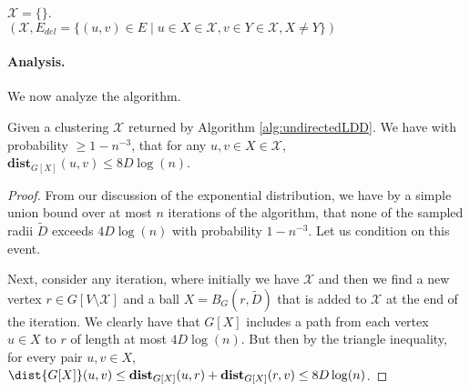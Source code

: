 \begin{algorithm}
$\mathcal{X} = \{\}$.\\
\Return $(\mathcal{X}, E_{del} = \{ (u,v) \in E \;|\; u \in X \in \mathcal{X}, v \in Y \in \mathcal{X}, X \neq Y\})$
\caption{$\textsc{ComputeLDD}(G, D)$}
\label{alg:undirectedLDD}
\end{algorithm}

\paragraph{Analysis.} We now analyze the algorithm.

\begin{claim}
Given a clustering $\mathcal{X}$ returned by Algorithm \ref{alg:undirectedLDD}. We have with probability $\geq 1 - n^{-3}$, that for any $u,v \in X \in \mathcal{X}$, $\mathbf{dist}_{G[X]}(u,v) \leq 8 D \log(n)$. 
\end{claim}
\begin{proof}
From our discussion of the exponential distribution, we have by a simple union bound over at most $n$ iterations of the algorithm, that none of the sampled radii $\tilde{D}$ exceeds $4 D \log(n)$ with probability $1 - n^{-3}$. Let us condition on this event. 

Next, consider any iteration, where initially we have $\mathcal{X}$ and then we find a new vertex $r \in G[V \setminus \mathcal{X}]$ and a ball $X = B_G(r, \tilde{D})$ that is added to $\mathcal{X}$ at the end of the iteration. We clearly have that $G[X]$ includes a path from each vertex $u \in X$ to $r$ of length at most $4 D \log(n)$. But then by the triangle inequality, for every pair $u,v \in X$, $\dist{G[X]}(u,v) \leq \mathbf{dist}_{G[X]}(u,r) + \mathbf{dist}_{G[X]}(r,v) \leq 8 D \log(n)$.
\end{proof}

